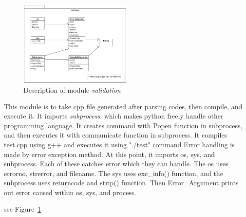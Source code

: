 \documentclass[conference]{IEEEtran}
\begin{document}
\label{sub:validation}
\begin{figure}[ht]
\centering
\includegraphics[width=0.5\textwidth]{./figures/comp_exec.png}
\caption{Description of module \textit{validation}}
\label{validation}
\end{figure}
This module is to take cpp file generated after parsing codes, then compile, and execute it.
It imports \textit{subprocess}, which makes python freely handle other programming language.
It creates command with Popen function in subprocess, and then executes it with communicate function in subprocess.
It compiles test.cpp using g++ and executes it using "./test" command
Error handling is made by error exception method. 
At this point, it imports os, sys, and subprocess. 
Each of these catches error which they can handle.
The os uses errorno, strerror, and filename.
The sys uses exc\_info() function, and the subprocess uses returncode and strip() function.
Then Error\_Argument prints out error caused within os, sys, and process.

see Figure~\ref{validation}
\end{document}
